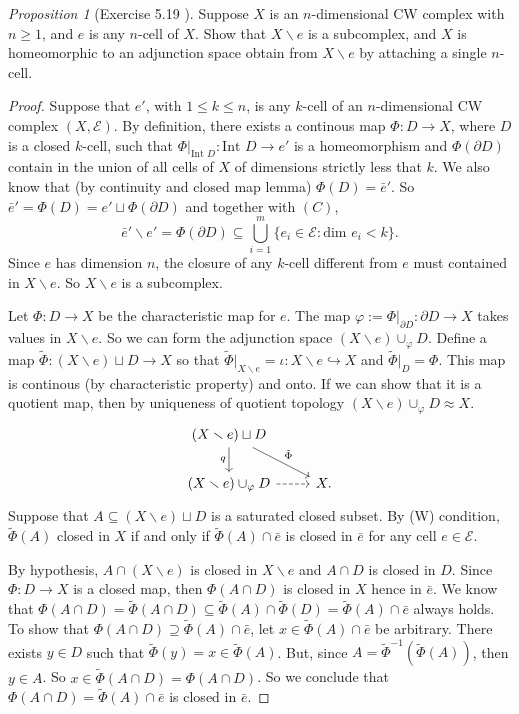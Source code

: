 \documentclass[a4paper]{article}
\theoremstyle{remark}
\newtheorem{prop}{Proposition}
\newcommand{\doo}{\partial}    %
\newcommand{\subhim}{\subseteq} %
\newcommand{\Inter}{\text{Int }} %
\begin{document}
\begin{prop}[Exercise 5.19 \cite{LeeTM}]
	Suppose $X$ is an $n$-dimensional CW complex with $n\geq 1$, and $e$ is any $n$-cell of $X$. Show that $X \smallsetminus e$ is a subcomplex, and $X$ is homeomorphic to an adjunction space obtain from $X\smallsetminus e$ by attaching a single $n$-cell.
\end{prop}
\begin{proof}
	Suppose that $e'$, with $1\leq k \leq n$, is any $k$-cell of an $n$-dimensional CW complex $(X,\mathcal{E})$. By definition, there exists a continous map  $\Phi : D \to X$, where $D$ is a closed $k$-cell, such that $\Phi|_{\Inter D} : \Inter D \to e'$ is a homeomorphism and $\Phi(\partial D)$ contain in the union of all cells of $X$ of dimensions strictly less that $k$. We also know that (by continuity and closed map lemma) $\Phi(D)= \bar{e}'$. So $\bar{e}' = \Phi(D) = e' \sqcup \Phi(\doo D)$ and together with $(C)$,
	$$
	\bar{e}' \smallsetminus e' = \Phi(\doo D) \subhim \bigcup_{i=1}^{m} \{e_i \in \mathcal{E} : \text{dim }e_i < k \}.
	$$
	Since $e$ has dimension $n$, the closure of any $k$-cell different from $e$ must contained in $X \smallsetminus e$. So $X \smallsetminus e$  is a subcomplex.
	
	Let $\Phi : D \to X $ be the characteristic map for $e$. The map $\varphi := \Phi|_{\doo D} : \doo D \to X$ takes values in $X\smallsetminus e$. So we can form the adjunction space $(X\smallsetminus e) \cup_{\varphi} D$. Define a map $\tilde{\Phi} : (X \smallsetminus e) \sqcup D \to X$ so that $\tilde{\Phi}|_{X\smallsetminus e} = \iota : X\smallsetminus e \hookrightarrow X$ and $\tilde{\Phi}|_D  = \Phi$. This map is continous (by characteristic property) and onto. If we can show that it is a quotient map, then  by uniqueness of quotient topology $(X\smallsetminus e) \cup_{\varphi} D \approx X$.
	\[
	\begin{tikzcd}
	 (X \smallsetminus e) \sqcup D \arrow[d,"q",swap] \arrow[dr,"\tilde{\Phi}"] & \\
	(X\smallsetminus e) \cup_{\varphi} D \arrow[r,dashrightarrow] & X.
	\end{tikzcd}
	\]
	Suppose that $A \subhim (X \smallsetminus e) \sqcup D $ is a saturated closed subset. By (W) condition, $\tilde{\Phi}(A)$ closed in $X$ if and only if $\tilde{\Phi}(A) \cap \bar{e}$ is closed in $\bar{e}$ for any cell $e \in \mathcal{E}$.
	
	By hypothesis, $A \cap (X \smallsetminus e)$ is closed in $X \smallsetminus e$ and $A \cap D$ is closed in $D$. Since $\Phi : D \to X$ is a closed map, then $\Phi(A \cap D)$ is closed in $X$ hence in $\bar{e}$. We know that $\Phi(A \cap D) =\tilde{\Phi}(A \cap D) \subhim \tilde{\Phi}(A) \cap \tilde{\Phi}(D) = \tilde{\Phi}(A) \cap \bar{e}$ always holds. To show that $\Phi(A \cap D) \supseteq \tilde{\Phi}(A) \cap \bar{e}$, let $x \in \tilde{\Phi}(A) \cap \bar{e}$ be arbitrary. There exists $y \in D$ such that $\tilde{\Phi}(y) = x \in \tilde{\Phi}(A)$. But, since $A=\tilde{\Phi}^{-1}(\tilde{\Phi}(A))$, then $y \in A$. So $x \in \tilde{\Phi}(A \cap D) = \Phi(A \cap D)$. So we conclude that $\Phi(A \cap D) = \tilde{\Phi}(A) \cap \bar{e}$ is closed in $\bar{e}$.
	

\end{proof}
\end{document}
